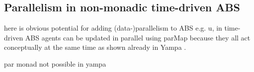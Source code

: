 \subsection{Parallelism in non-monadic time-driven ABS}
here is obvious potential for adding (data-)parallelism to ABS e.g. u, in time-driven ABS agents can be updated in parallel using parMap because they all act conceptually at the same time as shown already in Yampa \cite{perez_60_2014}.


par monad not possible in yampa
